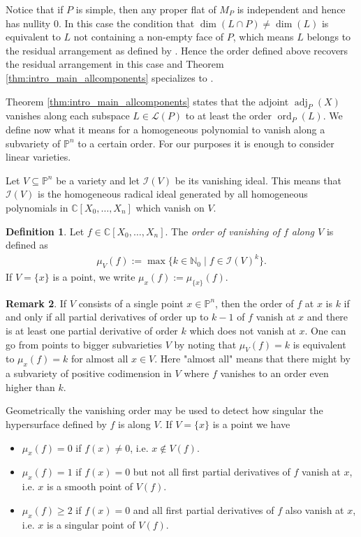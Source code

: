 \documentclass[a4paper,10pt]{amsart}
\theoremstyle{definition}
\newtheorem{defin}{Definition}[section]
\newtheorem{remark}[defin]{Remark}
\theoremstyle{plain}
\newcommand{\ord}{\operatorname{ord}}
\newcommand{\adj}{\operatorname{adj}} %
\newcommand{\cI}{{\mathcal I}}
\newcommand{\cL}{{\mathcal L}}
\newcommand{\C}{{\mathbb C}}
\newcommand{\pp}{\mathbb{P}}
\newcommand{\N}{{\mathbb N}}
\begin{document}
 Notice that if $P$ is simple, then any proper flat of $M_P$ is independent and hence has nullity 0. In this case the condition that $\dim(L\cap P)\neq \dim(L)$ is equivalent to $L$ not containing a non-empty face of $P$, which means $L$ belongs to the residual arrangement as defined by \cite{KohnRanestad2019AdjCurves}. Hence the order defined above recovers the residual arrangement in this case and Theorem \ref{thm:intro_main_allcomponents} specializes to \cite[Theorem 1]{KohnRanestad2019AdjCurves}.



Theorem \ref{thm:intro_main_allcomponents} states that the adjoint $\adj_P(X)$ vanishes along each subspace $L\in \cL(P)$ to at least the order $\ord_P(L)$. We define now what it means for a homogeneous polynomial to vanish along a subvariety of $\pp^n$ to a certain order. For our purposes it is enough to consider linear varieties.

Let $V\subseteq \pp^n$ be a variety and let $\mathcal{I}(V)$ be its vanishing ideal. This means that $\cI(V)$ is the homogeneous radical ideal generated by all homogeneous polynomials in $\C[X_0,\ldots,X_n]$ which vanish on $V$.

\begin{defin}
    Let $f\in \C[X_0,\ldots,X_n]$. The \emph{order of vanishing of $f$ along $V$} is defined as \begin{align*}
        \mu_V(f):=\max \{k \in \N_0 \mid f \in \mathcal{I}(V)^k\}.
    \end{align*} 
    If $V=\{x\}$ is a point, we write $\mu_x(f):=\mu_{\{x\}}(f)$.
\end{defin}

\begin{remark}
\label{rem:vanishing_order}
If $V$ consists of a single point $x \in \pp^n$, then the order of $f$ at $x$ is $k$ if and only if all partial derivatives of order up to $k-1$ of $f$ vanish at $x$ and there is at least one partial derivative of order $k$ which does not vanish at $x$. One can go from points to bigger subvarieties $V$ by noting that $\mu_V(f)=k$ is equivalent to $\mu_x(f)=k$ for almost all $x \in V$. Here "almost all" means that there might by a subvariety of positive codimension in $V$ where $f$ vanishes to an order even higher than $k$.
\end{remark}

Geometrically the vanishing order may be used to detect how singular the hypersurface defined by $f$ is along $V$. If $V=\{x\}$ is a point we have \begin{itemize}
    \item $\mu_x(f)=0$ if $f(x)\neq 0$, i.e. $x\notin V(f)$.
    \item $\mu_x(f)=1$ if $f(x)=0$ but not all first partial derivatives of $f$ vanish at $x$, i.e. $x$ is a smooth point of $V(f)$.
    \item $\mu_x(f)\geq 2$ if $f(x)=0$ and all first partial derivatives of $f$ also vanish at $x$, i.e. $x$ is a singular point of $V(f)$.
\end{itemize}
\end{document}
